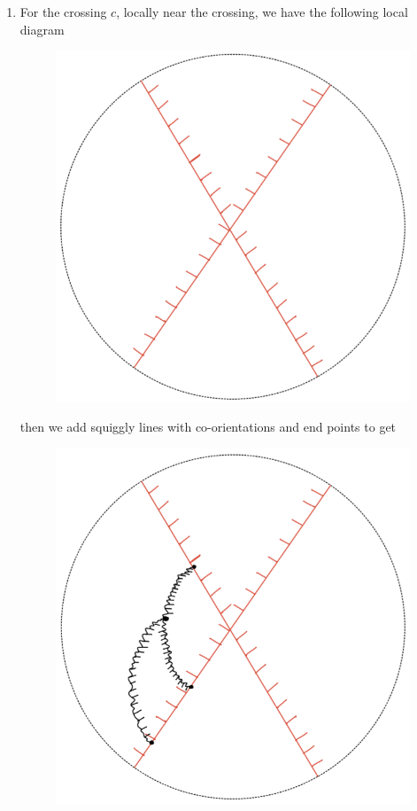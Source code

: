 \begin{definition}
\begin{enumerate}[label = (\roman*)]
\item For the crossing $c$, locally near the crossing, we have the following local diagram
\begin{figure}[H] 
    \centering
    \includegraphics[scale = 0.95]{diagrams/local_systems_on_as_diagrams/9.png} 
    \caption{}
    \label{fig:your-label}
\end{figure}
then we add squiggly lines with co-orientations and end points to get
\begin{figure}[H] 
    \centering
    \includegraphics[scale = 0.95]{diagrams/local_systems_on_as_diagrams/10.png} 

\end{figure}
\end{enumerate}
\end{definition}
